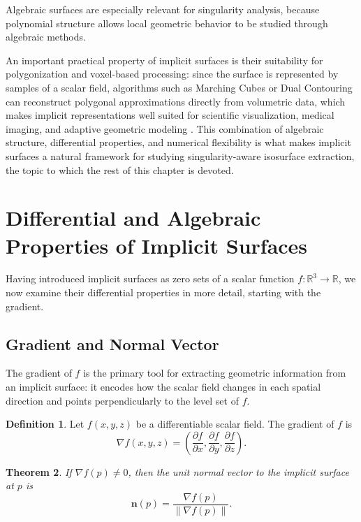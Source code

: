 \documentclass[12pt, a4paper, oneside]{book}
\theoremstyle{plain}
\newtheorem{theorem}{Theorem}[chapter]
\theoremstyle{definition}
\newtheorem{definition}[theorem]{Definition}
\theoremstyle{remark}
\theoremstyle{definition}
\begin{document}
Algebraic surfaces are especially relevant for singularity analysis, because polynomial
structure allows local geometric behavior to be studied through algebraic methods.

An important practical property of implicit surfaces is their suitability for polygonization and voxel-based processing: since the surface is represented by samples of a scalar field, algorithms such as Marching Cubes or Dual Contouring can reconstruct polygonal approximations directly from volumetric data, which makes implicit representations well suited for scientific visualization, medical imaging, and adaptive
geometric modeling \cite{bloomenthal2000implicit}. This combination of algebraic
structure, differential properties, and numerical flexibility is what makes implicit
surfaces a natural framework for studying singularity-aware isosurface extraction, the
topic to which the rest of this chapter is devoted.

\section{Differential and Algebraic Properties of Implicit Surfaces}

Having introduced implicit surfaces as zero sets of a scalar function
$f:\mathbb{R}^3 \rightarrow \mathbb{R}$, we now examine their differential properties in
more detail, starting with the gradient.

\subsection{Gradient and Normal Vector}

The gradient of $f$ is the primary tool for extracting geometric information from an
implicit surface: it encodes how the scalar field changes in each spatial direction and
points perpendicularly to the level set of $f$.

\begin{definition}%
Let $f(x,y,z)$ be a differentiable scalar field. The gradient of $f$ is
\[
\nabla f(x,y,z) = \left(\frac{\partial f}{\partial x}, \frac{\partial f}{\partial y},
\frac{\partial f}{\partial z}\right).
\]
\end{definition}

\begin{theorem}%
If $\nabla f(p) \neq 0$, then the unit normal vector to the implicit surface at $p$ is
\[
\mathbf{n}(p) = \frac{\nabla f(p)}{\|\nabla f(p)\|}.
\]
\end{theorem}
\end{document}
